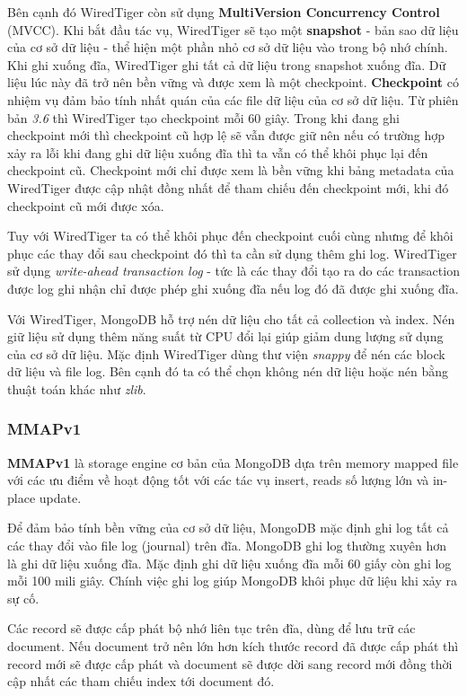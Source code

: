 Bên cạnh đó WiredTiger còn sử dụng \textbf{MultiVersion Concurrency Control} (MVCC). Khi bắt đầu tác vụ, WiredTiger sẽ tạo một \textbf{snapshot} - bản sao dữ liệu của cơ sở dữ liệu - thể hiện một phần nhỏ cơ sở dữ liệu vào trong bộ nhớ chính. Khi ghi xuống đĩa, WiredTiger ghi tất cả dữ liệu trong snapshot xuống đĩa. Dữ liệu lúc này đã trở nên bền vững và được xem là một checkpoint. \textbf{Checkpoint} có nhiệm vụ đảm bảo tính nhất quán của các file dữ liệu của cơ sở dữ liệu. Từ phiên bản \textit{3.6} thì WiredTiger tạo checkpoint mỗi 60 giây. Trong khi đang ghi checkpoint mới thì checkpoint cũ hợp lệ sẽ vẫn được giữ nên nếu có trường hợp xảy ra lỗi khi đang ghi dữ liệu xuống đĩa thì ta vẫn có thể khôi phục lại đến checkpoint cũ. Checkpoint mới chỉ được xem là bền vững khi bảng metadata của WiredTiger được cập nhật đồng nhất để tham chiếu đến checkpoint mới, khi đó checkpoint cũ mới được xóa.

Tuy với WiredTiger ta có thể khôi phục đến checkpoint cuối cùng nhưng để khôi phục các thay đổi sau checkpoint đó thì ta cần sử dụng thêm ghi log. WiredTiger sử dụng \textit{write-ahead transaction log} - tức là các thay đổi tạo ra do các transaction được log ghi nhận chỉ được phép ghi xuống đĩa nếu log đó đã được ghi xuống đĩa.

Với WiredTiger, MongoDB hỗ trợ nén dữ liệu cho tất cả collection và index. Nén giữ liệu sử dụng thêm năng suất từ CPU đổi lại giúp giảm dung lượng sử dụng của cơ sở dữ liệu. Mặc định WiredTiger dùng thư viện \textit{snappy} để nén các block dữ liệu và file log. Bên cạnh đó ta có thể chọn không nén dữ liệu hoặc nén bằng thuật toán khác như \textit{zlib}.
\subsubsection{MMAPv1}
\textbf{MMAPv1} là storage engine cơ bản của MongoDB dựa trên memory mapped file với các ưu điểm về hoạt động tốt với các tác vụ insert, reads số lượng lớn và in-place update.

Để đảm bảo tính bền vững của cơ sở dữ liệu, MongoDB mặc định ghi log tất cả các thay đổi vào file log (journal) trên đĩa. MongoDB ghi log thường xuyên hơn là ghi dữ liệu xuống đĩa. Mặc định ghi dữ liệu xuống đĩa mỗi 60 giấy còn ghi log mỗi 100 mili giây. Chính việc ghi log giúp MongoDB khôi phục dữ liệu khi xảy ra sự cố.

Các record sẽ được cấp phát bộ nhớ liên tục trên đĩa, dùng để lưu trữ các document. Nếu document trở nên lớn hơn kích thước record đã được cấp phát thì record mới sẽ được cấp phát và document sẽ được dời sang record mới đồng thời cập nhất các tham chiếu index tới document đó.
